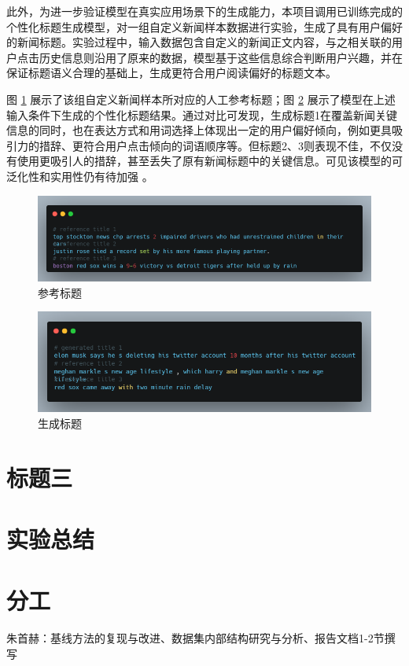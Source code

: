 \documentclass[10pt,a4paper]{article}
\begin{document}
此外，为进一步验证模型在真实应用场景下的生成能力，本项目调用已训练完成的个性化标题生成模型，对一组自定义新闻样本数据进行实验，生成了具有用户偏好的新闻标题。实验过程中，输入数据包含自定义的新闻正文内容，与之相关联的用户点击历史信息则沿用了原来的数据，模型基于这些信息综合判断用户兴趣，并在保证标题语义合理的基础上，生成更符合用户阅读偏好的标题文本。

图 \ref{fig:ref} 展示了该组自定义新闻样本所对应的人工参考标题；图 \ref{fig:gen} 展示了模型在上述输入条件下生成的个性化标题结果。通过对比可发现，生成标题1在覆盖新闻关键信息的同时，也在表达方式和用词选择上体现出一定的用户偏好倾向，例如更具吸引力的措辞、更符合用户点击倾向的词语顺序等。但标题2、3则表现不佳，不仅没有使用更吸引人的措辞，甚至丢失了原有新闻标题中的关键信息。可见该模型的可泛化性和实用性仍有待加强
。
\begin{figure}[H]
  \centering
  \includegraphics[width=15cm]{fig/reference.png}
  \caption{参考标题}\label{fig:ref}
\end{figure}
\begin{figure}[H]
  \centering
  \includegraphics[width=15cm]{fig/generated.png}
  \caption{生成标题}\label{fig:gen}
\end{figure}


\section{标题三}

\section{实验总结}

\section{分工}
朱首赫：基线方法的复现与改进、数据集内部结构研究与分析、报告文档1-2节撰写
\end{document}
